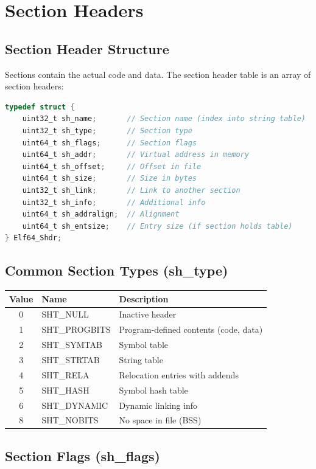 \section{Section Headers}

\subsection{Section Header Structure}

Sections contain the actual code and data. The section header table is an array of section headers:

\begin{lstlisting}[language=C]
typedef struct {
    uint32_t sh_name;       // Section name (index into string table)
    uint32_t sh_type;       // Section type
    uint64_t sh_flags;      // Section flags
    uint64_t sh_addr;       // Virtual address in memory
    uint64_t sh_offset;     // Offset in file
    uint64_t sh_size;       // Size in bytes
    uint32_t sh_link;       // Link to another section
    uint32_t sh_info;       // Additional info
    uint64_t sh_addralign;  // Alignment
    uint64_t sh_entsize;    // Entry size (if section holds table)
} Elf64_Shdr;
\end{lstlisting}

\subsection{Common Section Types (sh\_type)}

\begin{tabular}{|c|l|l|}
\hline
\textbf{Value} & \textbf{Name} & \textbf{Description} \\
\hline
0 & SHT\_NULL & Inactive header \\
\hline
1 & SHT\_PROGBITS & Program-defined contents (code, data) \\
\hline
2 & SHT\_SYMTAB & Symbol table \\
\hline
3 & SHT\_STRTAB & String table \\
\hline
4 & SHT\_RELA & Relocation entries with addends \\
\hline
5 & SHT\_HASH & Symbol hash table \\
\hline
6 & SHT\_DYNAMIC & Dynamic linking info \\
\hline
8 & SHT\_NOBITS & No space in file (BSS) \\
\hline
\end{tabular}

\subsection{Section Flags (sh\_flags)}

